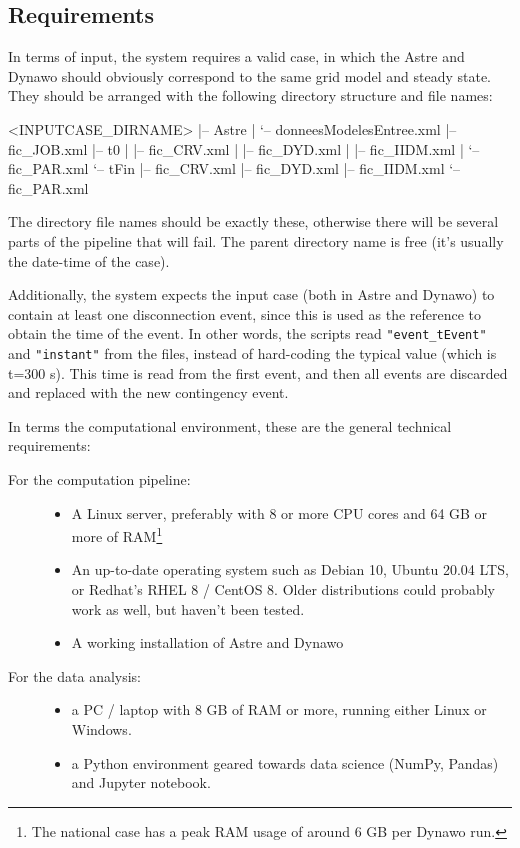 \documentclass[11pt, a4paper, twoside, titlepage]{article}
\newcommand{\code}[1]{\texttt{#1}}
\begin{document}
\subsection{Requirements}
\label{subsec:reqmts}

In terms of input, the system requires a valid case, in which the
Astre and Dynawo should obviously correspond to the same grid model
and steady state.  They should be arranged with the following
directory structure and file names:
\begin{console}
  <INPUTCASE_DIRNAME>
  |-- Astre
  |   `-- donneesModelesEntree.xml
  |-- fic_JOB.xml
  |-- t0
  |   |-- fic_CRV.xml
  |   |-- fic_DYD.xml
  |   |-- fic_IIDM.xml
  |   `-- fic_PAR.xml
  `-- tFin
      |-- fic_CRV.xml
      |-- fic_DYD.xml
      |-- fic_IIDM.xml
      `-- fic_PAR.xml
\end{console}

The directory file names should be exactly these, otherwise there will
be several parts of the pipeline that will fail. The parent directory
name is free (it's usually the date-time of the case).

Additionally, the system expects the input case (both in Astre and
Dynawo) to contain at least one disconnection event, since this is
used as the reference to obtain the time of the event. In other words,
the scripts read \code{"event\_tEvent"} and \code{"instant"} from
the files, instead of hard-coding the typical value (which is t=300
s). This time is read from the first event, and then all events are
discarded and replaced with the new contingency event.

In terms the computational environment, these are the general
technical requirements:
\begin{description}
\item[For the computation pipeline:] \hfill
  \begin{itemize}
  \item A Linux server, preferably with 8 or more CPU cores and 64 GB
    or more of RAM\footnote{The national case has a peak RAM usage of
      around 6 GB per Dynawo run.}
  \item An up-to-date operating system such as Debian 10, Ubuntu 20.04
    LTS, or Redhat's RHEL 8 / CentOS 8. Older distributions could
    probably work as well, but haven't been tested.
  \item A working installation of Astre and Dynawo
  \end{itemize}
\item[For the data analysis:] \hfill
  \begin{itemize}
  \item a PC / laptop with 8 GB of RAM or more, running either Linux or
    Windows.
  \item a Python environment geared towards data science (NumPy,
    Pandas) and Jupyter notebook.
  \end{itemize}
\end{description}
\end{document}
